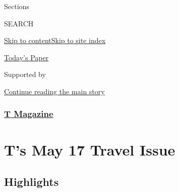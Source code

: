 Sections

SEARCH

\protect\hyperlink{site-content}{Skip to
content}\protect\hyperlink{site-index}{Skip to site index}

\href{https://myaccount.nytimes.com/auth/login?response_type=cookie\&client_id=vi}{}

\href{https://www.nytimes.com/section/todayspaper}{Today's Paper}

Supported by

\protect\hyperlink{after-sponsor}{Continue reading the main story}

\hypertarget{t-magazine}{%
\subsubsection{\texorpdfstring{\href{/section/t-magazine}{T
Magazine}}{T Magazine}}\label{t-magazine}}

\hypertarget{ts-may-17-travel-issue}{%
\section{T's May 17 Travel Issue}\label{ts-may-17-travel-issue}}

\hypertarget{highlights}{%
\subsection{Highlights}\label{highlights}}

